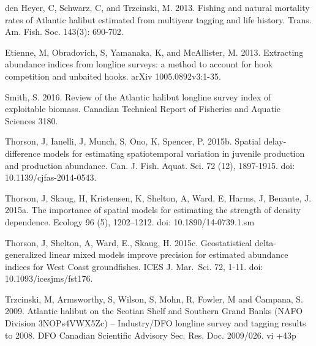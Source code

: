\documentclass[12pt]{article}\usepackage[]{graphicx}\usepackage[]{color}
\begin{document}
\begin{appendices}
den Heyer, C, Schwarz, C, and Trzcinski, M. 2013. Fishing and natural mortality rates of Atlantic halibut estimated from multiyear tagging and life history. Trans. Am. Fish. Soc. 143(3): 690-702.

Etienne, M, Obradovich, S, Yamanaka, K, and McAllister, M. 2013. Extracting abundance indices from longline surveys: a method to account for hook competition and unbaited hooks. arXiv 1005.0892v3:1-35.

Smith, S. 2016. Review of the Atlantic halibut longline survey index of exploitable biomass. Canadian Technical Report of Fisheries and Aquatic Sciences 3180.

Thorson, J, Ianelli, J, Munch, S, Ono, K, Spencer, P. 2015b. Spatial delay-difference models for estimating spatiotemporal variation in juvenile production and production abundance. Can. J. Fish. Aquat. Sci. 72 (12), 1897-1915. doi: 10.1139/cjfas-2014-0543.

Thorson, J, Skaug, H, Kristensen, K, Shelton, A, Ward, E, Harms, J, Benante, J. 2015a. The importance of spatial models for estimating the strength of density dependence. Ecology 96 (5), 1202--1212. doi: 10.1890/14-0739.1.sm

Thorson, J, Shelton, A, Ward, E., Skaug, H. 2015c. Geostatistical delta-generalized linear mixed models improve precision for estimated abundance indices for West Coast groundfishes. ICES J. Mar.~Sci. 72, 1-11. doi: 10.1093/icesjms/fst176.

Trzcinski, M, Armsworthy, S, Wilson, S, Mohn, R, Fowler, M and Campana, S. 2009. Atlantic halibut on the Scotian Shelf and Southern Grand Banks (NAFO Division 3NOPs4VWX5Zc) -- Industry/DFO longline survey and tagging results to 2008. DFO Canadian Scientific Advisory Sec. Res. Doc. 2009/026. vi +43p

\clearpage

\section{}
\label{app:second-appendix}
\begin{figure}[htb]


\end{figure}
\end{appendices}
\end{document}

